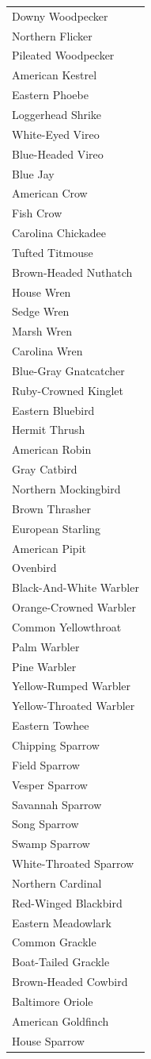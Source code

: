\documentclass[]{article}
\begin{document}
\begin{longtable}{l}
Downy Woodpecker\\
\addlinespace
Northern Flicker\\
Pileated Woodpecker\\
American Kestrel\\
Eastern Phoebe\\
Loggerhead Shrike\\
\addlinespace
White-Eyed Vireo\\
Blue-Headed Vireo\\
Blue Jay\\
American Crow\\
Fish Crow\\
\addlinespace
Carolina Chickadee\\
Tufted Titmouse\\
Brown-Headed Nuthatch\\
House Wren\\
Sedge Wren\\
\addlinespace
Marsh Wren\\
Carolina Wren\\
Blue-Gray Gnatcatcher\\
Ruby-Crowned Kinglet\\
Eastern Bluebird\\
\addlinespace
Hermit Thrush\\
American Robin\\
Gray Catbird\\
Northern Mockingbird\\
Brown Thrasher\\
\addlinespace
European Starling\\
American Pipit\\
Ovenbird\\
Black-And-White Warbler\\
Orange-Crowned Warbler\\
\addlinespace
Common Yellowthroat\\
Palm Warbler\\
Pine Warbler\\
Yellow-Rumped Warbler\\
Yellow-Throated Warbler\\
\addlinespace
Eastern Towhee\\
Chipping Sparrow\\
Field Sparrow\\
Vesper Sparrow\\
Savannah Sparrow\\
\addlinespace
Song Sparrow\\
Swamp Sparrow\\
White-Throated Sparrow\\
Northern Cardinal\\
Red-Winged Blackbird\\
\addlinespace
Eastern Meadowlark\\
Common Grackle\\
Boat-Tailed Grackle\\
Brown-Headed Cowbird\\
Baltimore Oriole\\
\addlinespace
American Goldfinch\\
House Sparrow\\
\bottomrule
\end{longtable}
\end{document}
